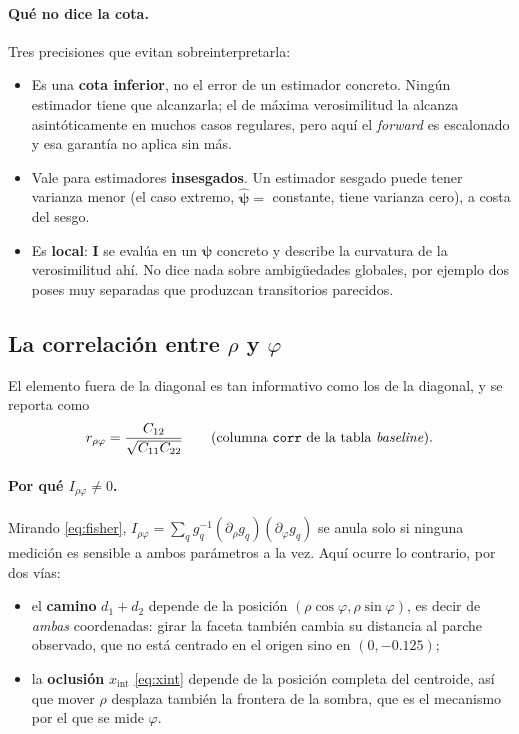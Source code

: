 \documentclass[11pt,a4paper]{article}
\newcommand{\vect}[1]{\boldsymbol{#1}}
\newcommand{\matr}[1]{\mathbf{#1}}
\newcommand{\code}[1]{\texttt{#1}}
\theoremstyle{definition}
\theoremstyle{plain}
\begin{document}
\paragraph{Qué no dice la cota.}
Tres precisiones que evitan sobreinterpretarla:
%
\begin{itemize}[leftmargin=*]
  \item Es una \textbf{cota inferior}, no el error de un estimador concreto.
        Ningún estimador tiene que alcanzarla; el de máxima verosimilitud la
        alcanza asintóticamente en muchos casos regulares, pero aquí el
        \emph{forward} es escalonado y esa garantía no aplica sin más.
  \item Vale para estimadores \textbf{insesgados}. Un estimador sesgado puede
        tener varianza menor (el caso extremo, $\hat{\vect\psi}=$ constante,
        tiene varianza cero), a costa del sesgo.
  \item Es \textbf{local}: $\matr I$ se evalúa en un $\vect\psi$ concreto y
        describe la curvatura de la verosimilitud ahí. No dice nada sobre
        ambigüedades globales, por ejemplo dos poses muy separadas que produzcan
        transitorios parecidos.
\end{itemize}

\subsection{La correlación entre \texorpdfstring{$\rho$ y $\varphi$}{rho y phi}}
\label{sec:corr}

El elemento fuera de la diagonal es tan informativo como los de la diagonal, y
se reporta como
%
\begin{equation}
\label{eq:corr}
r_{\rho\varphi} = \frac{C_{12}}{\sqrt{C_{11}C_{22}}}
\qquad\text{(columna \code{corr} de la tabla \emph{baseline})}.
\end{equation}

\paragraph{Por qué $I_{\rho\varphi}\ne0$.}
Mirando \eqref{eq:fisher}, $I_{\rho\varphi}=\sum_q
g_q^{-1}(\partial_\rho g_q)(\partial_\varphi g_q)$ se anula solo si ninguna
medición es sensible a ambos parámetros a la vez. Aquí ocurre lo contrario, por
dos vías:
%
\begin{itemize}[leftmargin=*]
  \item el \textbf{camino} $d_1+d_2$ depende de la posición
        $(\rho\cos\varphi,\rho\sin\varphi)$, es decir de \emph{ambas}
        coordenadas: girar la faceta también cambia su distancia al parche
        observado, que no está centrado en el origen sino en $(0,-0.125)$;
  \item la \textbf{oclusión} $x_{\text{int}}$ \eqref{eq:xint} depende de la
        posición completa del centroide, así que mover $\rho$ desplaza también
        la frontera de la sombra, que es el mecanismo por el que se mide
        $\varphi$.
\end{itemize}
\end{document}
